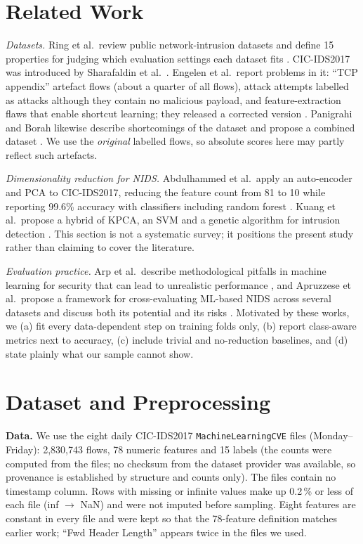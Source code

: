 \documentclass[conference]{IEEEtran}
\begin{document}
\section{Related Work}
\textit{Datasets.} Ring et al.\ review public network-intrusion datasets and define 15 properties for judging which evaluation settings each dataset fits \cite{ring2019}. CIC-IDS2017 was introduced by Sharafaldin et al.\ \cite{sharafaldin2018}. Engelen et al.\ report problems in it: ``TCP appendix'' artefact flows (about a quarter of all flows), attack attempts labelled as attacks although they contain no malicious payload, and feature-extraction flaws that enable shortcut learning; they released a corrected version \cite{engelen2021}. Panigrahi and Borah likewise describe shortcomings of the dataset and propose a combined dataset \cite{panigrahi2018}. We use the \emph{original} labelled flows, so absolute scores here may partly reflect such artefacts.

\textit{Dimensionality reduction for NIDS.} Abdulhammed et al.\ apply an auto-encoder and PCA to CIC-IDS2017, reducing the feature count from 81 to 10 while reporting 99.6\% accuracy with classifiers including random forest \cite{abdulhammed2019}. Kuang et al.\ propose a hybrid of KPCA, an SVM and a genetic algorithm for intrusion detection \cite{kuang2014}. This section is not a systematic survey; it positions the present study rather than claiming to cover the literature.

\textit{Evaluation practice.} Arp et al.\ describe methodological pitfalls in machine learning for security that can lead to unrealistic performance \cite{arp2022}, and Apruzzese et al.\ propose a framework for cross-evaluating ML-based NIDS across several datasets and discuss both its potential and its risks \cite{apruzzese2022}. Motivated by these works, we (a) fit every data-dependent step on training folds only, (b) report class-aware metrics next to accuracy, (c) include trivial and no-reduction baselines, and (d) state plainly what our sample cannot show.

\section{Dataset and Preprocessing}\label{sec:data}
\textbf{Data.} We use the eight daily CIC-IDS2017 \texttt{MachineLearningCVE} files (Monday--Friday): 2{,}830{,}743 flows, 78 numeric features and 15 labels (the counts were computed from the files; no checksum from the dataset provider was available, so provenance is established by structure and counts only). The files contain no timestamp column. Rows with missing or infinite values make up 0.2\,\% or less of each file (inf $\to$ NaN) and were not imputed before sampling. Eight features are constant in every file and were kept so that the 78-feature definition matches earlier work; ``Fwd Header Length'' appears twice in the files we used.
\end{document}
